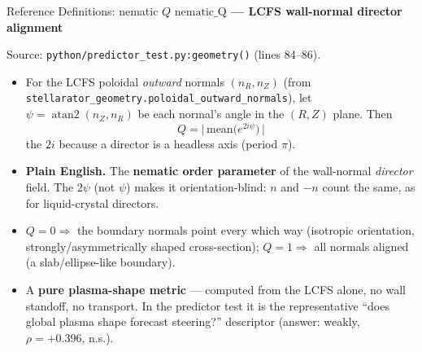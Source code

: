 \documentclass[11pt,aspectratio=169]{beamer}
\newcommand{\qitem}[1]{\medskip\textbf{#1}\par}
\begin{document}
\begin{frame}[allowframebreaks]{Reference Definitions: nematic $Q$}
\small
\qitem{$\mathrm{nematic\_Q}$ --- LCFS wall-normal director alignment}
Source: \texttt{python/predictor\_test.py:geometry()} (lines 84--86).
\begin{itemize}
\item For the LCFS poloidal \emph{outward} normals $(n_R, n_Z)$ (from
      \texttt{stellarator\_geometry.poloidal\_outward\_normals}), let
      $\psi = \operatorname{atan2}(n_Z, n_R)$ be each normal's angle in the $(R,Z)$ plane.
      Then
\[
Q = \big|\,\text{mean}\big(e^{2i\psi}\big)\,\big|
\]
the $2i$ because a director is a headless axis (period $\pi$).
\item \textbf{Plain English.} The \textbf{nematic order parameter} of the wall-normal
      \emph{director} field. The $2\psi$ (not $\psi$) makes it orientation-blind: $n$ and
      $-n$ count the same, as for liquid-crystal directors.
\item $Q = 0 \Rightarrow$ the boundary normals point every which way (isotropic orientation,
      strongly/asymmetrically shaped cross-section); $Q = 1 \Rightarrow$ all normals aligned
      (a slab/ellipse-like boundary).
\item A \textbf{pure plasma-shape metric} --- computed from the LCFS alone, no wall standoff,
      no transport. In the predictor test it is the representative ``does global plasma shape
      forecast steering?'' descriptor (answer: weakly, $\rho = +0.396$, n.s.).
\end{itemize}
\end{frame}
\end{document}
